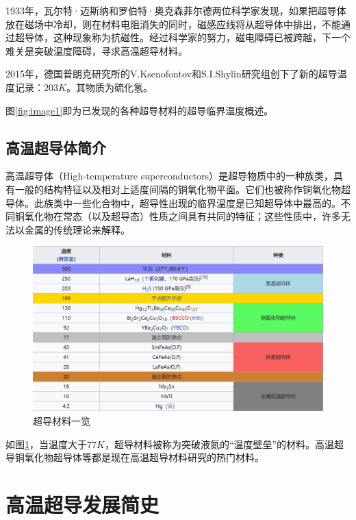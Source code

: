 \documentclass[UTF8, twocolumn]{ctexart}
\begin{document}
    1933年，瓦尔特·迈斯纳和罗伯特·奥克森菲尔德两位科学家发现，如果把超导体放在磁场中冷却，则在材料电阻消失的同时，磁感应线将从超导体中排出，不能通过超导体，这种现象称为抗磁性。经过科学家的努力，磁电障碍已被跨越，下一个难关是突破温度障碍，寻求高温超导材料。

    2015年，德国普朗克研究所的V.Ksenofontov和S.I.Shylin研究组创下了新的超导温度记录：$203K$。其物质为硫化氢。

    图\ref{fig:image1}即为已发现的各种超导材料的超导临界温度概述\cite{Ray2016}。

    \subsection{高温超导体简介}

    高温超导体（High-temperature superconductors）是超导物质中的一种族类，具有一般的结构特征以及相对上适度间隔的铜氧化物平面。它们也被称作铜氧化物超导体。此族类中一些化合物中，超导性出现的临界温度是已知超导体中最高的。不同铜氧化物在常态（以及超导态）性质之间具有共同的特征；这些性质中，许多无法以金属的传统理论来解释。

    \begin{figure}[ht]
        \centering
        \includegraphics[scale=0.7]{image/超导材料.png}
        \caption{超导材料一览}
        \label{fig:image2}
    \end{figure}

    如图\ref{fig:image2}，当温度大于$77K$，超导材料被称为突破液氮的“温度壁垒”的材料。高温超导铜氧化物超导体等都是现在高温超导材料研究的热门材料。

\section{高温超导发展简史}
\end{document}
